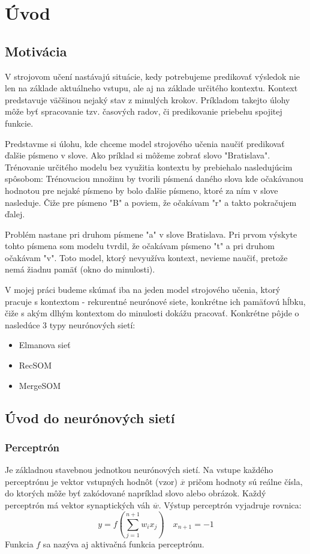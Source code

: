 \chapter{Úvod}

\section{Motivácia}
V strojovom učení nastávajú situácie, kedy potrebujeme predikovať výsledok nie len na základe aktuálneho vstupu, 
ale aj na základe určitého kontextu. Kontext predstavuje väčšinou nejaký stav z minulých krokov.
Príkladom takejto úlohy môže byť spracovanie tzv. časových radov, či predikovanie priebehu spojitej funkcie.

Predstavme si úlohu, kde chceme model strojového učenia naučiť predikovať ďalšie písmeno v slove. Ako príklad si môžeme zobrať slovo "Bratislava". 
Trénovanie určitého modelu bez využitia kontextu by prebiehalo nasledujúcim spôsobom:
Trénovaciou množinu by tvorili písmená daného slova kde očakávanou hodnotou pre nejaké písmeno by bolo ďalšie písmeno, ktoré za ním v slove nasleduje.
Čiže pre písmeno "B" a poviem, že očakávam "r" a takto pokračujem ďalej. 

Problém nastane pri druhom písmene "a" v slove Bratislava. Pri prvom výskyte tohto písmena som modelu tvrdil, že očakávam písmeno "t" a 
pri druhom očakávam "v". Toto model, ktorý nevyužíva kontext, nevieme naučiť, pretože nemá žiadnu pamäť (okno do minulosti).

V mojej práci budeme skúmať iba na jeden model strojového učenia, ktorý pracuje s kontextom - rekurentné neurónové siete, konkrétne ich 
pamäťovú hĺbku, čiže s akým dlhým kontextom do minulosti dokážu pracovať. Konkrétne pôjde o nasledúce 3 typy neurónových sietí:

\begin{itemize}
	\item Elmanova sieť
	\item RecSOM
	\item MergeSOM
\end{itemize}

\section{Úvod do neurónových sietí}

\subsection{Perceptrón}
Je základnou stavebnou jednotkou neurónových sietí. 
Na vstupe každého perceptrónu je vektor vstupných hodnôt (vzor) $\overline{x}$ pričom hodnoty sú reálne čísla, do ktorých môže byť zakódované
napríklad slovo alebo obrázok. Každý perceptrón má vektor synaptických váh $\overline{w}$. 
Výstup perceptrón vyjadruje rovnica:
\begin{equation}
	y = f (\sum_{j=1}^{n+1} w_{i} x_{j}) \quad x_{n+1} = -1
\end{equation}
Funkcia $f$ sa nazýva aj aktivačná funkcia perceptrónu. 

